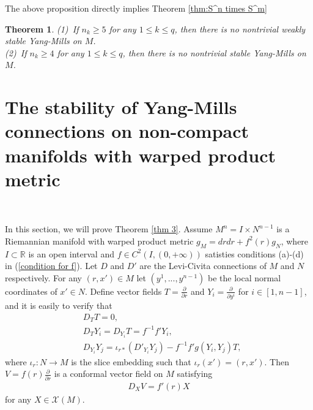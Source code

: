 \documentclass{amsart}
\newtheorem{theorem}{Theorem}[section]
\begin{document}
	The above proposition directly implies Theorem \ref{thm:S^n times S^m}
	\begin{theorem}
		(1)\ If $n_k\ge5$ for any $1\le k\le q$, then there is no nontrivial weakly stable Yang-Mills on $M$.\\
		(2)\ If $n_k\ge4$ for any $1\le k\le q$, then there is no nontrivial stable Yang-Mills on $M$.
	\end{theorem}
	\section{The stability of Yang-Mills connections on non-compact manifolds with warped product metric}\ 
	
	In this section, we will prove Theorem \ref{thm 3}. Assume $M^n=I\times N^{n-1}$ is a Riemannian manifold with warped product metric $g_M=drdr+f^2(r)g_N$, where $I\subset\mathbb{R}$ is an open interval and $f\in C^2(I,(0,+\infty))$ satisties conditions (a)-(d) in (\ref{condition for f}). Let $D$ and $D'$ are the Levi-Civita connections of $M$ and $N$ respectively. For any $(r,x')\in M$ let $(y^1,...,y^{n-1})$ be the local normal coordinates of $x'\in N$. Define vector fields $T=\frac{\partial}{\partial r}$ and $Y_i=\frac{\partial}{\partial y^i}$ for $i\in[1,n-1]$, and it is easily to verify that
	\begin{equation}\label{L-C connections on w-p mfd}
		\begin{split}
			&D_TT=0,\\
			&D_TY_i=D_{Y_i}T=f^{-1}f'Y_i,\\
			&D_{Y_i}Y_j=\iota_{r\ast}(D'_{Y_i}Y_j)-f^{-1}f'g(Y_i,Y_j)T,
		\end{split}
	\end{equation}
	where $\iota_r:N\to M$ is the slice embedding such that $\iota_r(x')=(r,x')$. Then $V=f(r)\frac{\partial}{\partial r}$ is a conformal vector field on $M$ satisfying
	\begin{align*}
		D_XV=f'(r)X
	\end{align*}
	for any $X\in\mathscr{X}(M)$.
	
\end{document}
